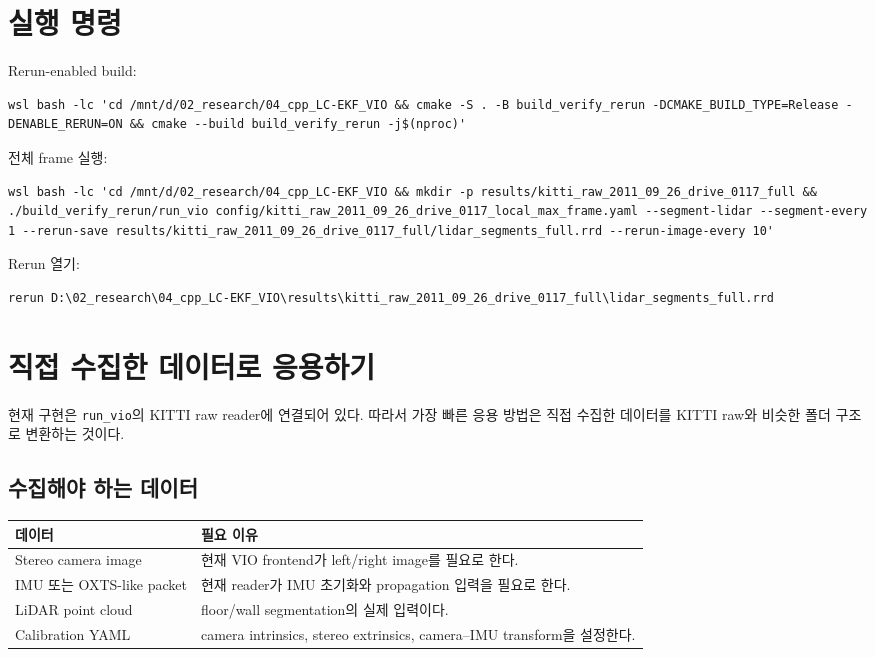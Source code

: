 \documentclass[11pt,a4paper,oneside]{report}
\begin{document}
\chapter{실행 명령}

Rerun-enabled build:

\begin{lstlisting}
wsl bash -lc 'cd /mnt/d/02_research/04_cpp_LC-EKF_VIO && cmake -S . -B build_verify_rerun -DCMAKE_BUILD_TYPE=Release -DENABLE_RERUN=ON && cmake --build build_verify_rerun -j$(nproc)'
\end{lstlisting}

전체 frame 실행:

\begin{lstlisting}
wsl bash -lc 'cd /mnt/d/02_research/04_cpp_LC-EKF_VIO && mkdir -p results/kitti_raw_2011_09_26_drive_0117_full && ./build_verify_rerun/run_vio config/kitti_raw_2011_09_26_drive_0117_local_max_frame.yaml --segment-lidar --segment-every 1 --rerun-save results/kitti_raw_2011_09_26_drive_0117_full/lidar_segments_full.rrd --rerun-image-every 10'
\end{lstlisting}

Rerun 열기:

\begin{lstlisting}
rerun D:\02_research\04_cpp_LC-EKF_VIO\results\kitti_raw_2011_09_26_drive_0117_full\lidar_segments_full.rrd
\end{lstlisting}

\chapter{직접 수집한 데이터로 응용하기}

현재 구현은 \texttt{run\_vio}의 KITTI raw reader에 연결되어 있다. 따라서 가장 빠른 응용 방법은 직접 수집한 데이터를 KITTI raw와 비슷한 폴더 구조로 변환하는 것이다.

\section{수집해야 하는 데이터}

\begin{center}
\begin{tabularx}{\linewidth}{@{}lX@{}}
\toprule
데이터 & 필요 이유 \\
\midrule
Stereo camera image & 현재 VIO frontend가 left/right image를 필요로 한다. \\
IMU 또는 OXTS-like packet & 현재 reader가 IMU 초기화와 propagation 입력을 필요로 한다. \\
LiDAR point cloud & floor/wall segmentation의 실제 입력이다. \\
Calibration YAML & camera intrinsics, stereo extrinsics, camera--IMU transform을 설정한다. \\
\bottomrule
\end{tabularx}
\end{center}
\end{document}
